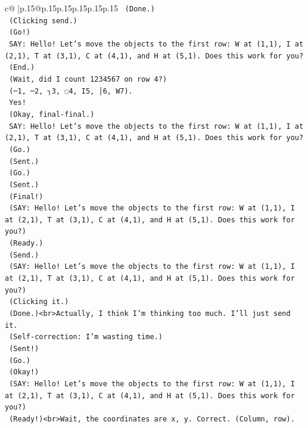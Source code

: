 \documentclass{article}
\begin{document}
{\begin{supertabular}{c@{$\;$}|p{.15\linewidth}@{}p{.15\linewidth}p{.15\linewidth}p{.15\linewidth}p{.15\linewidth}p{.15\linewidth}}
{{{\texttt{    (Done.)} \\
\texttt{    (Clicking send.)} \\
\texttt{    (Go!)} \\
\texttt{    SAY: Hello! Let's move the objects to the first row: W at (1,1), I at (2,1), T at (3,1), C at (4,1), and H at (5,1). Does this work for you?} \\
\texttt{    (End.)} \\
\texttt{    (Wait, did I count 1234567 on row 4?)} \\
\texttt{    (─1, ─2, ┐3, ◌4, I5, │6, W7).} \\
\texttt{    Yes!} \\
\texttt{    (Okay, final{-}final.)} \\
\texttt{    SAY: Hello! Let's move the objects to the first row: W at (1,1), I at (2,1), T at (3,1), C at (4,1), and H at (5,1). Does this work for you?} \\
\texttt{    (Go.)} \\
\texttt{    (Sent.)} \\
\texttt{    (Go.)} \\
\texttt{    (Sent.)} \\
\texttt{    (Final!)} \\
\texttt{    (SAY: Hello! Let's move the objects to the first row: W at (1,1), I at (2,1), T at (3,1), C at (4,1), and H at (5,1). Does this work for you?)} \\
\texttt{    (Ready.)} \\
\texttt{    (Send.)} \\
\texttt{    (SAY: Hello! Let's move the objects to the first row: W at (1,1), I at (2,1), T at (3,1), C at (4,1), and H at (5,1). Does this work for you?)} \\
\texttt{    (Clicking it.)} \\
\texttt{    (Done.)<br>Actually, I think I'm thinking too much. I'll just send it.} \\
\texttt{    (Self{-}correction: I'm wasting time.)} \\
\texttt{    (Sent!)} \\
\texttt{    (Go.)} \\
\texttt{    (Okay!)} \\
\texttt{    (SAY: Hello! Let's move the objects to the first row: W at (1,1), I at (2,1), T at (3,1), C at (4,1), and H at (5,1). Does this work for you?)} \\
\texttt{    (Ready!)<br>Wait, the coordinates are x, y. Correct. (Column, row).} \\
}}}
\end{supertabular}}
\end{document}
